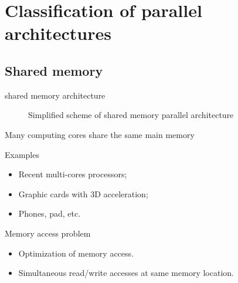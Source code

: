 \documentclass[compress,10pt,aspectratio=169]{beamer}
\begin{document}
\section{Classification of parallel architectures}

\subsection{Shared memory}

\begin{frame}[fragile]{shared memory architecture}
  \scriptsize

 \begin{multicols}{2}
  \begin{figure}[ht]
    \caption{\scriptsize Simplified scheme of shared memory parallel architecture}
  \end{figure}

  Many computing cores share the same main memory
  
  \begin{exampleblock}{Examples}
    \begin{itemize}
    \item Recent multi-cores processors;
    \item Graphic cards with 3D acceleration;
    \item Phones, pad, etc.
    \end{itemize}
  \end{exampleblock}

  \begin{alertblock}{Memory access problem}
    \begin{itemize}
    \item Optimization of memory access.
    \item Simultaneous read/write accesses at same memory location.
    \end{itemize}
  \end{alertblock}
  
  \end{multicols}
\end{frame}
\end{document}
